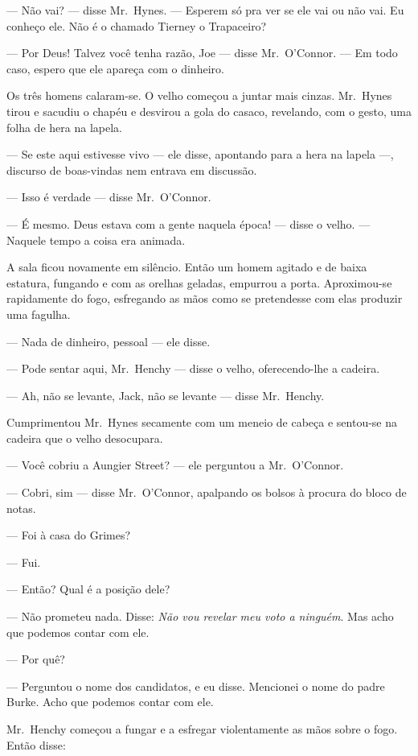 --- Não vai? --- disse Mr.~Hynes.  --- Esperem só pra ver se ele vai ou não
vai.  Eu conheço ele.  Não é o chamado Tierney o Trapaceiro?

--- Por Deus!  Talvez você tenha razão, Joe --- disse Mr.~O’Connor.  --- Em
todo caso, espero que ele apareça com o dinheiro.

Os três homens calaram-se.  O velho começou a juntar mais cinzas.  Mr.~Hynes
tirou e sacudiu o chapéu e desvirou a gola do casaco, revelando, com o gesto,
uma folha de hera na lapela.

--- Se este aqui estivesse vivo --- ele disse, apontando para a hera na lapela
---, discurso de boas-vindas nem entrava em discussão.

--- Isso é verdade --- disse Mr.~O’Connor.

--- É mesmo.  Deus estava com a gente naquela época! --- disse o velho.  ---
Naquele tempo a coisa era animada.

A sala ficou novamente em silêncio.  Então um homem agitado e de baixa
estatura, fungando e com as orelhas geladas, empurrou a porta.  Aproximou-se
rapidamente do fogo, esfregando as mãos como se pretendesse com elas produzir
uma fagulha.

--- Nada de dinheiro, pessoal --- ele disse.

--- Pode sentar aqui, Mr.~Henchy --- disse o velho, oferecendo-lhe a cadeira.

--- Ah, não se levante, Jack, não se levante --- disse Mr.~Henchy.

Cumprimentou Mr.~Hynes secamente com um meneio de cabeça e sentou-se na cadeira
que o velho desocupara.

--- Você cobriu a Aungier Street? --- ele perguntou a Mr.~O’Connor.

--- Cobri, sim --- disse Mr.~O’Connor, apalpando os bolsos à procura do bloco
de notas.

--- Foi à casa do Grimes?

--- Fui.

--- Então?  Qual é a posição dele?

--- Não prometeu nada.  Disse: \textit{Não vou revelar meu voto a
ninguém}.  Mas acho que podemos contar com ele.

--- Por quê?

--- Perguntou o nome dos candidatos, e eu disse.  Mencionei o nome do padre
Burke.  Acho que podemos contar com ele.

Mr.~Henchy começou a fungar e a esfregar violentamente as mãos sobre o fogo.
Então disse:

